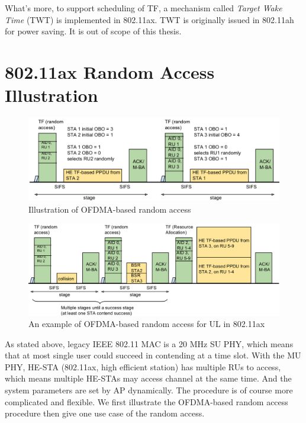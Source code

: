 What's more, to support scheduling of TF, a mechanism called \textit{Target Wake Time} (TWT) is implemented in 802.11ax. TWT is originally issued in 802.11ah for power saving\cite{khorov2015survey}. It is out of scope of this thesis.



\section{802.11ax Random Access Illustration}		\label{sec_RA_illu}
\begin{figure}[!t]
\centering
\includegraphics[scale=0.35]{./figure/chp2/RA_illu.png}
\caption{Illustration of OFDMA-based random access}
\label{fig_ra_illu}
\end{figure}



\begin{figure}[!t]
\centering
\includegraphics[scale=0.35]{./figure/chp2/RA_illu_2.png}
\caption{An example of OFDMA-based random access for UL in 802.11ax}
\label{fig_ra_ul}
\end{figure}

As stated above, legacy IEEE 802.11 MAC is a 20 MHz SU PHY, which means that at most single user could succeed in contending at a time slot.
With the MU PHY, HE-STA (802.11ax, high efficient station) has multiple RUs to access, which means multiple HE-STAs may access channel at the same time.
And the system parameters are set by AP dynamically.
The procedure is of course more complicated and flexible.
We first illustrate the OFDMA-based random access procedure then give one use case of the random access.

